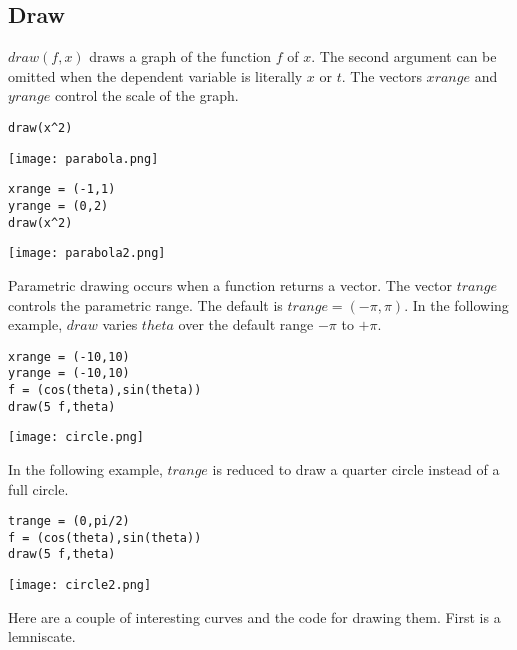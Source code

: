\subsection{Draw}

$draw(f,x)$ draws a graph of the function $f$ of $x$.
The second argument can be omitted when the dependent variable
is literally $x$ or $t$.
The vectors $xrange$ and $yrange$ control the scale of the graph.

{\color{blue}
\begin{verbatim}
draw(x^2)
\end{verbatim}
}

\begin{center}
\texttt{[image: parabola.png]}
\end{center}

{\color{blue}
\begin{verbatim}
xrange = (-1,1)
yrange = (0,2)
draw(x^2)
\end{verbatim}
}

\begin{center}
\texttt{[image: parabola2.png]}
\end{center}

\noindent
Parametric drawing occurs when a function returns a vector.
The vector $trange$ controls the parametric range.
The default is $trange=(-\pi,\pi)$.
In the following example, $draw$ varies $theta$
over the default range $-\pi$ to $+\pi$.

{\color{blue}
\begin{verbatim}
xrange = (-10,10)
yrange = (-10,10)
f = (cos(theta),sin(theta))
draw(5 f,theta)
\end{verbatim}
}

\begin{center}
\texttt{[image: circle.png]}
\end{center}

\noindent
In the following example, $trange$ is reduced
to draw a quarter circle instead of a full circle.

{\color{blue}
\begin{verbatim}
trange = (0,pi/2)
f = (cos(theta),sin(theta))
draw(5 f,theta)
\end{verbatim}
}

\begin{center}
\texttt{[image: circle2.png]}
\end{center}

\noindent
Here are a couple of interesting curves and the code for drawing them.
First is a lemniscate.

